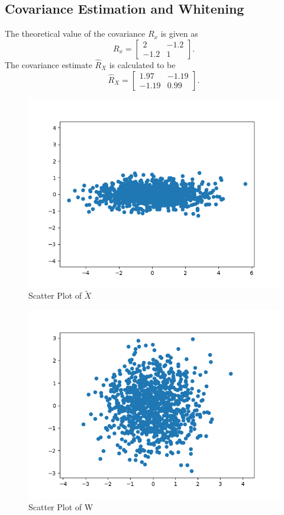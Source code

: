 \documentclass{article}
\begin{document}
\subsection{Covariance Estimation and Whitening}
The theoretical value of the covariance $R_x$ is given as
\begin{equation*}
R_x = 
\begin{bmatrix}
    2 & -1.2 \\
    -1.2 & 1
\end{bmatrix}.
\end{equation*}
The covariance estimate $\hat{R}_X$ is calculated to be
\begin{equation*}
\hat{R}_X = 
\begin{bmatrix}
    1.97 & -1.19 \\
    -1.19 & 0.99
\end{bmatrix}.
\end{equation*}
\begin{figure}[H]
    \centering
    \includegraphics[width=1\textwidth]{../x-tilde-2-2.png}
    \caption{Scatter Plot of $\tilde{X}$}
\end{figure}
\begin{figure}[H]
    \centering
    \includegraphics[width=1\textwidth]{../w-2-2.png}
    \caption{Scatter Plot of W}
\end{figure}
\end{document}
